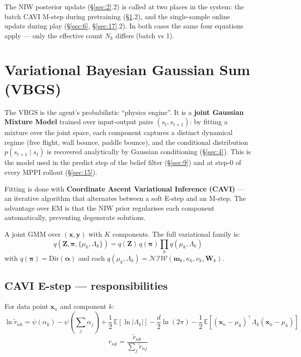\documentclass[12pt, a4paper]{article}
\newcommand{\E}{\mathbb{E}}
\newcommand{\1}{\mathbf{1}}
\newcommand{\cNIW}{\mathcal{NIW}}
\newcommand{\Dir}{\mathrm{Dir}}
\begin{document}
The NIW posterior update (\S\ref{sec:2}.2) is called at two places in the system:
the batch CAVI M-step during pretraining (\S\ref{sec:3}.2), and the
single-sample online update during play (\S\ref{sec:6}, \S\ref{sec:17}.2).  In
both cases the same four equations apply --- only the effective count $N_k$
differs (batch vs 1).

\section{Variational Bayesian Gaussian Sum (VBGS)}
\label{sec:3}

The VBGS is the agent's probabilistic ``physics engine''.  It is a
\textbf{joint Gaussian Mixture Model} trained over input-output pairs
$(s_t, s_{t+1})$: by fitting a mixture over the joint space, each component
captures a distinct dynamical regime (free flight, wall bounce, paddle bounce),
and the conditional distribution $p(s_{t+1} \mid s_t)$ is recovered analytically
by Gaussian conditioning (\S\ref{sec:4}).  This is the model used in the predict
step of the belief filter (\S\ref{sec:9}) and at step-0 of every MPPI rollout
(\S\ref{sec:15}).

Fitting is done with \textbf{Coordinate Ascent Variational Inference (CAVI)} ---
an iterative algorithm that alternates between a soft E-step and an M-step.  The
advantage over EM is that the NIW prior regularises each component automatically,
preventing degenerate solutions.

A joint GMM over $(\mathbf{x}, \mathbf{y})$ with $K$ components.
The full variational family is:
\[
q(\mathbf{Z}, \boldsymbol{\pi}, \{\mu_k, \Lambda_k\})
= q(\mathbf{Z})\,q(\boldsymbol{\pi})\prod_k q(\mu_k, \Lambda_k)
\]
with $q(\boldsymbol{\pi}) = \Dir(\boldsymbol{\alpha})$ and each
$q(\mu_k,\Lambda_k) = \cNIW(\mathbf{m}_k,\kappa_k,\nu_k,\mathbf{W}_k)$.

\subsection{CAVI E-step --- responsibilities}

For data point $\mathbf{x}_n$ and component $k$:
\[
\ln \tilde{r}_{nk}
= \psi(\alpha_k) - \psi\!\left(\sum_j \alpha_j\right)
+ \frac{1}{2}\,\E[\ln|\Lambda_k|]
- \frac{d}{2}\ln(2\pi)
- \frac{1}{2}\,\E\!\left[(\mathbf{x}_n - \mu_k)^\top\Lambda_k
  (\mathbf{x}_n - \mu_k)\right]
\]
\[
r_{nk} = \frac{\tilde{r}_{nk}}{\sum_j \tilde{r}_{nj}}
\]
\end{document}
